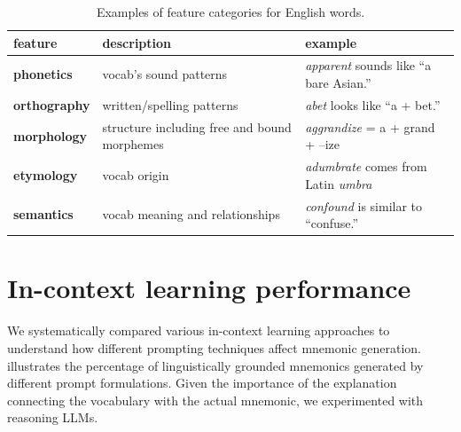 \documentclass[11pt]{article}
\begin{document}
\begin{table}[htb] \label{tab:linguistic-features}
\centering
\caption{Examples of feature categories for English words.}
\label{tab:features}
\begin{tabularx}{\textwidth}{l >{\raggedright\arraybackslash}X >{\raggedright\arraybackslash}X}
\toprule
\textbf{feature} & \textbf{description} & \textbf{example} \\
\midrule
\textbf{phonetics} & vocab's sound patterns & \emph{apparent} sounds like “a bare Asian.” \\
\addlinespace
\textbf{orthography} & written/spelling patterns & \emph{abet} looks like “a + bet.” \\
\addlinespace
\textbf{morphology} & structure including free and bound morphemes & \emph{aggrandize} = a + grand + –ize \\
\addlinespace
\textbf{etymology} & vocab origin & \emph{adumbrate} comes from Latin \emph{umbra} \\
\addlinespace
\textbf{semantics} & vocab meaning and relationships & \emph{confound} is similar to “confuse.” \\
\bottomrule
\end{tabularx}
\end{table}

\section{In-context learning performance} \label{sec:icl-performance}
We systematically compared various in-context learning approaches to understand how different prompting techniques affect mnemonic generation.  illustrates the percentage of linguistically grounded mnemonics generated by different prompt formulations. Given the importance of the explanation connecting the vocabulary with the actual mnemonic, we experimented with reasoning LLMs.
\end{document}
